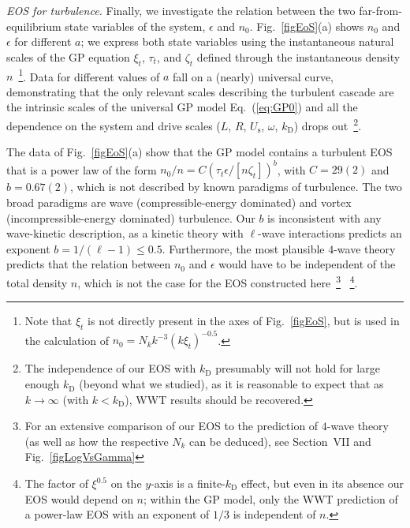 \documentclass[prl,aps,twocolumn, a4paper,longbibliography,superscriptaddress]{revtex4-2}
\newcommand{\kD}{k_{\textrm{D}}}
\newcommand{\Us}{U_{\textrm{s}}}
\begin{document}
\textit{EOS for turbulence.} Finally, we investigate the relation between the two far-from-equilibrium state variables of the system, $\epsilon$ and $n_0$. Fig.~\ref{figEoS}(a) shows $n_0$ and $\epsilon$ for different $a$; we express both state variables using the instantaneous natural scales of the GP equation $\xi_t$, $\tau_t$, and $\zeta_t$ defined through the instantaneous density $n$~\footnote{Note that $\xi_t$ is not directly present in the axes of Fig.~\ref{figEoS}, but is used in the calculation of $n_0=N_kk^{-3}(k\xi_t)^{-0.5}$.}. Data for different values of $a$ fall on a (nearly) universal curve, demonstrating that the only relevant scales describing the turbulent cascade are the intrinsic scales of the universal GP model Eq.~(\ref{eq:GP0}) and all the dependence on the system and drive scales ($L$, $R$, $\Us$, $\omega$, $\kD$) drops out~\footnote{{The independence of our EOS with $\kD$ presumably will not hold for large enough $\kD$ (beyond what we studied), as it is reasonable to expect that as $k\rightarrow\infty$ (with $k<\kD$), WWT results should be recovered.}}.

The data of Fig.~\ref{figEoS}(a) show that the GP model contains a turbulent EOS that is a power law of the form $n_0/n=C(\tau_t\epsilon/[n\zeta_t])^b$, with $C=29(2)$ and $b=0.67(2)$, which is not described by known paradigms of turbulence. The two broad paradigms are wave (compressible-energy dominated) and vortex (incompressible-energy dominated) turbulence. Our $b$ is inconsistent with any wave-kinetic description, as a kinetic theory with $\ell$-wave interactions predicts an exponent $b=1/(\ell-1)\leq0.5$.
Furthermore, the most plausible $4$-wave theory predicts that the relation between $n_0$ and $\epsilon$ would have to be independent of the total density $n$, which is not the case for the EOS constructed here~\footnote{For an extensive comparison of our EOS to the prediction of $4$-wave theory (as well as how the respective $N_k$ can be deduced), see Section~VII and Fig.~\ref{figLogVsGamma}}
~\footnote{The factor of $\xi^{0.5}$ on the $y$-axis is a finite-$\kD$ effect, but even in its absence our EOS would depend on $n$; within the GP model, only the WWT prediction of a power-law EOS with an exponent of $1/3$ is independent of $n$.}.
\end{document}
